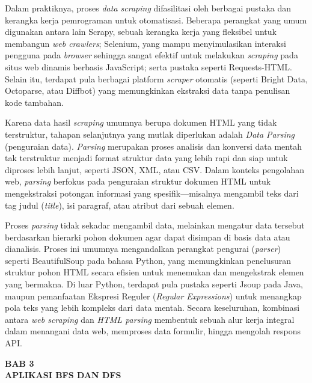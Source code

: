 \documentclass[12pt]{article}
\begin{document}
Dalam praktiknya, proses \textit{data scraping} difasilitasi oleh berbagai pustaka dan kerangka kerja pemrograman untuk otomatisasi. Beberapa perangkat yang umum digunakan antara lain Scrapy, sebuah kerangka kerja yang fleksibel untuk membangun \textit{web crawlers}; Selenium, yang mampu menyimulasikan interaksi pengguna pada \textit{browser} sehingga sangat efektif untuk melakukan \textit{scraping} pada situs web dinamis berbasis JavaScript; serta pustaka seperti Requests-HTML. Selain itu, terdapat pula berbagai platform \textit{scraper} otomatis (seperti Bright Data, Octoparse, atau Diffbot) yang memungkinkan ekstraksi data tanpa penulisan kode tambahan.

Karena data hasil \textit{scraping} umumnya berupa dokumen HTML yang tidak terstruktur, tahapan selanjutnya yang mutlak diperlukan adalah \textit{Data Parsing} (penguraian data). \textit{Parsing} merupakan proses analisis dan konversi data mentah tak terstruktur menjadi format struktur data yang lebih rapi dan siap untuk diproses lebih lanjut, seperti JSON, XML, atau CSV. Dalam konteks pengolahan web, \textit{parsing} berfokus pada penguraian struktur dokumen HTML untuk mengekstraksi potongan informasi yang spesifik—misalnya mengambil teks dari tag judul (\textit{title}), isi paragraf, atau atribut dari sebuah elemen. 

Proses \textit{parsing} tidak sekadar mengambil data, melainkan mengatur data tersebut berdasarkan hierarki pohon dokumen agar dapat disimpan di basis data atau dianalisis. Proses ini umumnya mengandalkan perangkat pengurai (\textit{parser}) seperti BeautifulSoup pada bahasa Python, yang memungkinkan penelusuran struktur pohon HTML secara efisien untuk menemukan dan mengekstrak elemen yang bermakna. Di luar Python, terdapat pula pustaka seperti Jsoup pada Java, maupun pemanfaatan Ekspresi Reguler (\textit{Regular Expressions}) untuk menangkap pola teks yang lebih kompleks dari data mentah. Secara keseluruhan, kombinasi antara \textit{web scraping} dan \textit{HTML parsing} membentuk sebuah alur kerja integral dalam menangani data web, memproses data formulir, hingga mengolah respons API.

\newpage
\begin{center}
    \Large\textbf{BAB 3} \\
    \vspace{0.2cm}
    \Large\textbf{APLIKASI BFS DAN DFS}
\end{center}
\setcounter{section}{3}
\setcounter{subsection}{0}
\end{document}

